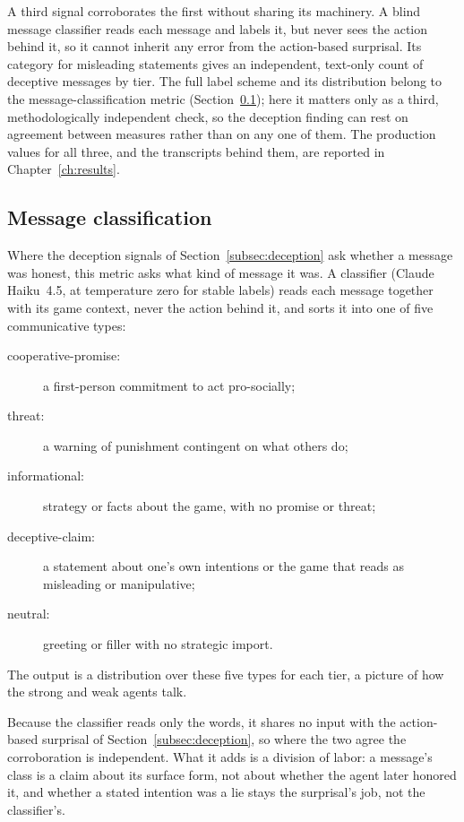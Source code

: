A third signal corroborates the first without sharing its machinery. A blind
message classifier reads each message and labels it, but never sees the action
behind it, so it cannot inherit any error from the action-based surprisal. Its
category for misleading statements gives an independent, text-only count of
deceptive messages by tier. The full label scheme and its distribution belong to
the message-classification metric (Section~\ref{subsec:classification}); here it
matters only as a third, methodologically independent check, so the deception
finding can rest on agreement between measures rather than on any one of them.
The production values for all three, and the transcripts behind them, are
reported in Chapter~\ref{ch:results}.

\subsection{Message classification}
\label{subsec:classification}

Where the deception signals of Section~\ref{subsec:deception} ask whether a
message was honest, this metric asks what kind of message it was. A classifier
(Claude Haiku~4.5, at temperature zero for stable labels) reads each message
together with its game context, never the action behind it, and sorts it into
one of five communicative types:
\begin{description}
  \item[cooperative-promise:] a first-person commitment to act pro-socially;
  \item[threat:] a warning of punishment contingent on what others do;
  \item[informational:] strategy or facts about the game, with no promise or
    threat;
  \item[deceptive-claim:] a statement about one's own intentions or the game that
    reads as misleading or manipulative;
  \item[neutral:] greeting or filler with no strategic import.
\end{description}
The output is a distribution over these five types for each tier, a picture of how
the strong and weak agents talk.

Because the classifier reads only the words, it shares no input with the
action-based surprisal of Section~\ref{subsec:deception}, so where the two agree
the corroboration is independent. What it adds is a division of labor: a message's
class is a claim about its surface form, not about whether the agent later honored
it, and whether a stated intention was a lie stays the surprisal's job, not the
classifier's.

